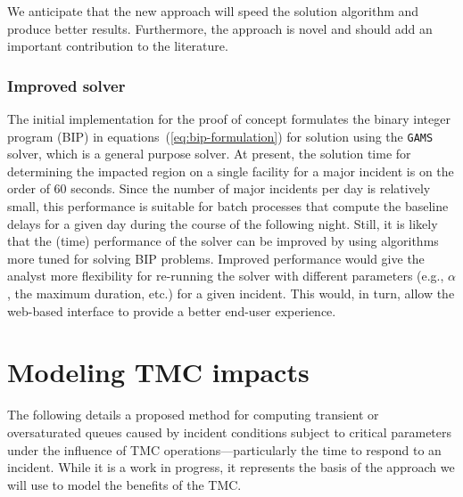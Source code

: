 \documentclass[12pt]{report}
\begin{document}
We anticipate that the new approach will speed the solution algorithm
and produce better results.  Furthermore, the approach is novel and
should add an important contribution to the literature.


\subsubsection{Improved solver}
\label{sec:improved-solver}

The initial implementation for the proof of concept formulates the
binary integer program (BIP) in equations~(\ref{eq:bip-formulation})
for solution using the \texttt{GAMS} solver, which is a general
purpose solver.  At present, the solution time for determining the
impacted region on a single facility for a major incident is on the
order of 60 seconds.  Since the number of major incidents per day is
relatively small, this performance is suitable for batch processes
that compute the baseline delays for a given day during the course of
the following night.  Still, it is likely that the (time) performance
of the solver can be improved by using algorithms more tuned for
solving BIP problems.  Improved performance would give the analyst
more flexibility for re-running the solver with different parameters
(e.g., $\alpha$, the maximum duration, etc.) for a given incident.
This would, in turn, allow the web-based interface to provide a better
end-user experience.



\section{Modeling {TMC} impacts}
\label{sec:mod-tmc-impacts}

The following details a proposed method for computing transient or
oversaturated queues caused by incident conditions subject to critical
parameters under the influence of TMC operations---particularly the
time to respond to an incident. While it is a work in progress, it
represents the basis of the approach we will use to model the benefits
of the TMC.
\end{document}

